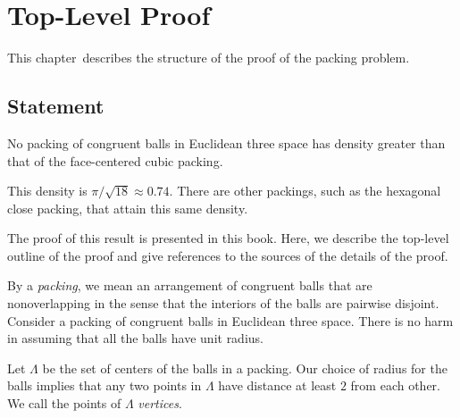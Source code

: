 



\label{part:form}
\chapter{Top-Level Proof}

\label{sec:overview}

This chapter\ describes the structure of the proof of the
 packing problem.


\section{Statement}\label{sec:statement}


\begin{theorem}
\label{theorem:kepler}   No packing of congruent balls in
Euclidean three space has density greater than that of the
face-centered cubic packing.
\end{theorem}

\begin{remark}
This density is $\pi/\sqrt{18}\approx 0.74.$  There are other
packings, such as the hexagonal close packing, that attain this
same density.
\end{remark}

The proof of this result is presented in this book. Here, we
describe the top-level outline of the proof and give references to
the sources of the details of the proof.

By a {\it packing}, we mean an arrangement of congruent balls that
are nonoverlapping in the sense that the interiors of the balls are
pairwise disjoint. Consider a  packing of congruent
balls in Euclidean three space. There is no harm in assuming that
all the balls have unit radius. 

%

Let $\Lambda$ be the set of centers of the balls in a
packing. Our choice of radius for the
balls implies that any two points in $\Lambda$ have distance at
least $2$ from each other. We call the points of $\Lambda$ {\it
{} vertices}.

